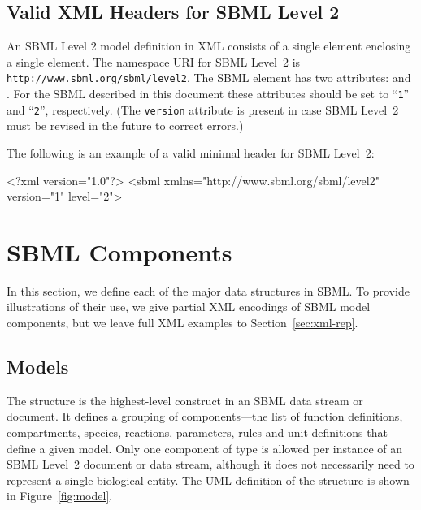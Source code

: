 \documentclass[10pt,twocolumntoc]{cekarticle}
\newcommand{\vref}[1]{\ref{#1}}
\begin{document}
\subsection{Valid XML Headers for SBML Level 2}
\label{sec:header}

An SBML Level 2 model definition in XML consists of a single 
element enclosing a single  element.  The namespace URI for
SBML Level~2 is \texttt{http://www.sbml.org/sbml/level2}.  The SBML element
has two attributes:  and .  For the SBML
described in this document these attributes should be set to ``\texttt{1}''
and ``\texttt{2}'', respectively.  (The \texttt{version} attribute is
present in case SBML Level~2 must be revised in the future to correct
errors.)

The following is an example of a valid minimal header for SBML Level~2:

\begin{example}
<?xml version="1.0"?>
<sbml xmlns="http://www.sbml.org/sbml/level2" version="1" level="2">
\end{example}


\section{SBML Components}
\label{sec:elements}

In this section, we define each of the major data structures in SBML. To
provide illustrations of their use, we give partial XML encodings of SBML
model components, but we leave full XML examples to
Section~\ref{sec:xml-rep}.


\subsection{Models}
\label{sec:model}

The  structure is the highest-level construct in an SBML data
stream or document.  It defines a grouping of components---the list of
function definitions, compartments, species, reactions, parameters, rules
and unit definitions that define a given model.  Only one component of type
 is allowed per instance of an SBML Level~2 document or data
stream, although it does not necessarily need to represent a single
biological entity.  The UML definition of the  structure is
shown in Figure~\vref{fig:model}.
\end{document}
